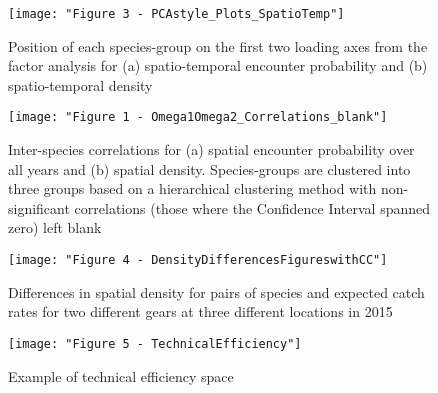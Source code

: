 \documentclass{nature}
\begin{document}
\begin{figure}
\begin{center}
	\texttt{[image: "Figure 3 - PCAstyle\_Plots\_SpatioTemp"]}
	\label{fig:2}
	\caption{Position of each species-group on the first two loading axes from the
	factor analysis for (a) spatio-temporal encounter probability and (b)
	spatio-temporal density}
\end{center}
\end{figure}

\begin{figure}
\begin{center}
	\texttt{[image: "Figure 1 - Omega1Omega2\_Correlations\_blank"]}
	\label{fig:3}
	\caption{Inter-species correlations for (a) spatial encounter
		probability over all years and (b) spatial density.
		Species-groups are clustered into three groups based on a
		hierarchical clustering method with non-significant
		correlations (those where the Confidence Interval spanned zero)
		left blank}
	\end{center}
\end{figure}

\begin{figure}
\begin{center}
	\texttt{[image: "Figure 4 - DensityDifferencesFigureswithCC"]}
	\label{fig:4}
	\caption{Differences in spatial density for pairs of species and
		expected catch rates for two different gears at three different
	locations in 2015}
\end{center}
\end{figure}

\begin{figure}
\begin{center}
	\texttt{[image: "Figure 5 - TechnicalEfficiency"]}
	\label{fig:5}
	\caption{Example of technical efficiency space}
\end{center}
\end{figure}
\end{document}
